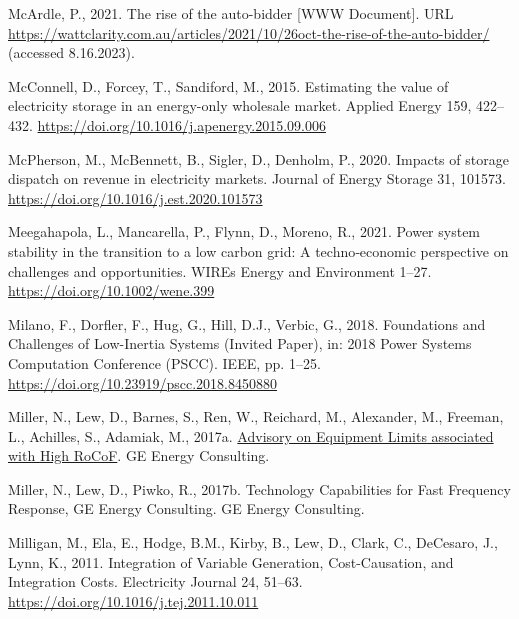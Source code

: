\documentclass[12pt,a4paper,]{report}
\newlength{\cslhangindent}
\newenvironment{CSLReferences}[2] %
 {%
  \setlength{\parindent}{0pt}
  \ifodd #1 \everypar{\setlength{\hangindent}{\cslhangindent}}\ignorespaces\fi
  \ifnum #2 > 0
  \setlength{\parskip}{#2\baselineskip}
  \fi
 }%
 {}
\begin{document}
\begin{CSLReferences}{1}{0}
\leavevmode{}%
McArdle, P., 2021. The rise of the auto-bidder {[}WWW Document{]}. URL
\url{https://wattclarity.com.au/articles/2021/10/26oct-the-rise-of-the-auto-bidder/}
(accessed 8.16.2023).

\leavevmode{}%
McConnell, D., Forcey, T., Sandiford, M., 2015. Estimating the value of
electricity storage in an energy-only wholesale market. Applied Energy
159, 422--432. \url{https://doi.org/10.1016/j.apenergy.2015.09.006}

\leavevmode{}%
McPherson, M., McBennett, B., Sigler, D., Denholm, P., 2020. Impacts of
storage dispatch on revenue in electricity markets. Journal of Energy
Storage 31, 101573. \url{https://doi.org/10.1016/j.est.2020.101573}

\leavevmode{}%
Meegahapola, L., Mancarella, P., Flynn, D., Moreno, R., 2021. Power
system stability in the transition to a low carbon grid: {A}
techno‐economic perspective on challenges and opportunities. WIREs
Energy and Environment 1--27. \url{https://doi.org/10.1002/wene.399}

\leavevmode{}%
Milano, F., Dorfler, F., Hug, G., Hill, D.J., Verbic, G., 2018.
Foundations and {Challenges} of {Low-Inertia Systems} ({Invited Paper}),
in: 2018 {Power Systems Computation Conference} ({PSCC}). {IEEE}, pp.
1--25. \url{https://doi.org/10.23919/pscc.2018.8450880}

\leavevmode{}%
Miller, N., Lew, D., Barnes, S., Ren, W., Reichard, M., Alexander, M.,
Freeman, L., Achilles, S., Adamiak, M., 2017a.
\href{https://www.aemo.com.au/-/media/Files/Electricity/NEM/Security_and_Reliability/Reports/2017/20170904-GE-RoCoF-Advisory}{Advisory
on {Equipment Limits} associated with {High RoCoF}}. {GE Energy
Consulting}.

\leavevmode{}%
Miller, N., Lew, D., Piwko, R., 2017b. Technology {Capabilities} for
{Fast Frequency Response}, GE Energy Consulting. {GE Energy Consulting}.

\leavevmode{}%
Milligan, M., Ela, E., Hodge, B.M., Kirby, B., Lew, D., Clark, C.,
DeCesaro, J., Lynn, K., 2011. Integration of {Variable Generation},
{Cost-Causation}, and {Integration Costs}. Electricity Journal 24,
51--63. \url{https://doi.org/10.1016/j.tej.2011.10.011}


\end{CSLReferences}
\end{document}
